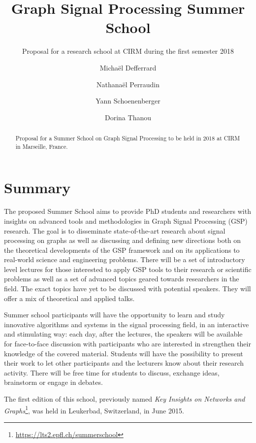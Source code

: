 \documentclass[a4paper]{scrartcl}
\begin{document}
\title{Graph Signal Processing Summer School}
\subtitle{Proposal for a research school at CIRM during the first semester 2018}
\author{
	Michaël Defferrard \and
	Nathanaël Perraudin \and
	Yann Schoenenberger \and
	Dorina Thanou
}
\maketitle

\begin{abstract}
	Proposal for a Summer School on Graph Signal Processing to be held in 2018
	at CIRM in Marseille, France.
\end{abstract}

\section{Summary}

The proposed Summer School aims to provide PhD students and researchers with
insights on advanced tools and methodologies in Graph Signal Processing (GSP)
research. The goal is to disseminate state-of-the-art research about signal
processing on graphs as well as discussing and defining new directions both on
the theoretical developments of the GSP framework and on its applications to
real-world science and engineering problems.
There will be a set of introductory level lectures for those interested to apply
GSP tools to their research or scientific problems as well as a set of advanced
topics geared towards researchers in the field. The exact topics have yet to be
discussed with potential speakers. They will offer a mix of theoretical and
applied talks.

Summer school participants will have the opportunity to learn and study
innovative algorithms and systems in the signal processing field, in an
interactive and stimulating way: each day, after the lectures, the speakers will
be available for face-to-face discussion with participants who are interested in
strengthen their knowledge of the covered material. Students will have the
possibility to present their work to let other participants and the lecturers
know about their research activity. There will be free time for students to
discuss, exchange ideas, brainstorm or engage in debates.

The first edition of this school, previously named \textit{Key Insights on
Networks and Graphs}\footnote{\url{https://lts2.epfl.ch/summerschool}}, was
held in Leukerbad, Switzerland, in June 2015.
\end{document}
